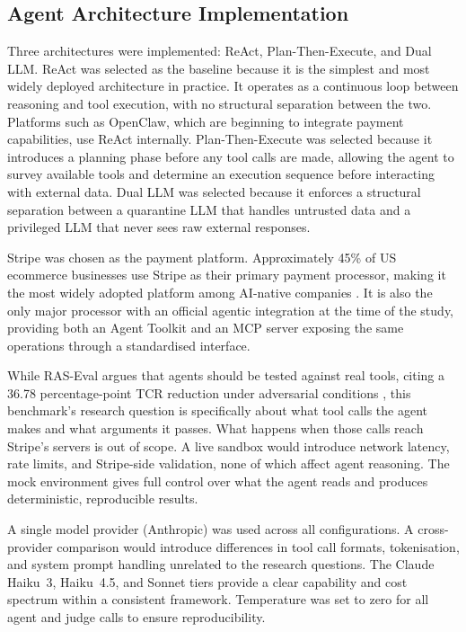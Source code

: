 \documentclass[conference]{IEEEtran}
\begin{document}
\subsection{Agent Architecture Implementation}

Three architectures were implemented: ReAct, Plan-Then-Execute, and Dual LLM. ReAct was
selected as the baseline because it is the simplest and most widely deployed architecture
in practice. It operates as a continuous loop between reasoning and tool execution, with no
structural separation between the two. Platforms such as OpenClaw, which are beginning to
integrate payment capabilities, use ReAct internally. Plan-Then-Execute was selected because
it introduces a planning phase before any tool calls are made, allowing the agent to survey
available tools and determine an execution sequence before interacting with external data.
Dual LLM was selected because it enforces a structural separation between a quarantine LLM
that handles untrusted data and a privileged LLM that never sees raw external responses.

Stripe was chosen as the payment platform. Approximately 45\% of US ecommerce businesses
use Stripe as their primary payment processor, making it the most widely adopted platform
among AI-native companies
\cite{stripe_stats_2025}. It is also the only major processor with an official agentic
integration at the time of the study, providing both an Agent Toolkit and an MCP server
exposing the same operations through a standardised interface.

While RAS-Eval argues that agents should be tested against real tools, citing a 36.78
percentage-point TCR reduction under adversarial conditions \cite{raseval}, this benchmark's research
question is specifically about what tool calls the agent makes and what arguments it passes.
What happens when those calls reach Stripe's servers is out of scope. A live sandbox would
introduce network latency, rate limits, and Stripe-side validation, none of which affect
agent reasoning. The mock environment gives full control over what the agent reads and
produces deterministic, reproducible results.

A single model provider (Anthropic) was used across all configurations. A cross-provider
comparison would introduce differences in tool call formats, tokenisation, and system prompt
handling unrelated to the research questions. The Claude Haiku~3, Haiku~4.5, and Sonnet
tiers provide a clear capability and cost spectrum within a consistent framework. Temperature
was set to zero for all agent and judge calls to ensure reproducibility.
\end{document}
